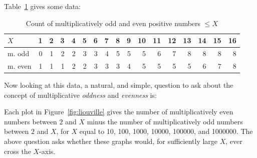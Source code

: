 \documentclass[openany]{book}
\theoremstyle{plain}
\theoremstyle{definition}
\begin{document}
 Table~\ref{tab:evenodddata} gives some data:

 \begin{table}[H] \caption{Count of multiplicatively odd and
    even positive numbers $\le X$\label{tab:evenodddata}}
\vspace{1ex}
\centering
 {\small
\begin{tabular}{|l|r|r|r|r|r|r|r|r|r|r|r|r|r|r|r|r|}
\hline
$X$ & 1 & 2 & 3 & 4 & 5  & 6 & 7 & 8 & 9 & 10 & 11 & 12 & 13 & 14 & 15 & 16  \\ \hline\hline
m. odd & 0 & 1 & 2 & 2 & 3  & 3 & 4 & 5 & 5 & 5 & 6 & 7 & 8 & 8 & 8 & 8 \\ \hline
m. even & 1 & 1 & 1 & 2 & 2  & 3 & 3 & 3 & 4 & 5 & 5 & 5 & 5 & 6 & 7 & 8 \\ \hline
\end{tabular}}
\end{table}


   Now looking at this data, a natural, and simple, question to ask about the concept of multiplicative {\em oddness} and {\em evenness} is:


   Each plot in Figure~\ref{fig:liouville} gives the number of
   multiplicatively even numbers between $2$ and $X$ minus the number
   of multiplicatively odd numbers between $2$ and $X$, for $X$ equal
   to 10, 100, 1000, 10000, 100000, and 1000000. The above question
   asks whether these graphs would, for sufficiently large $X$, ever
   cross the $X$-axis.
\end{document}

